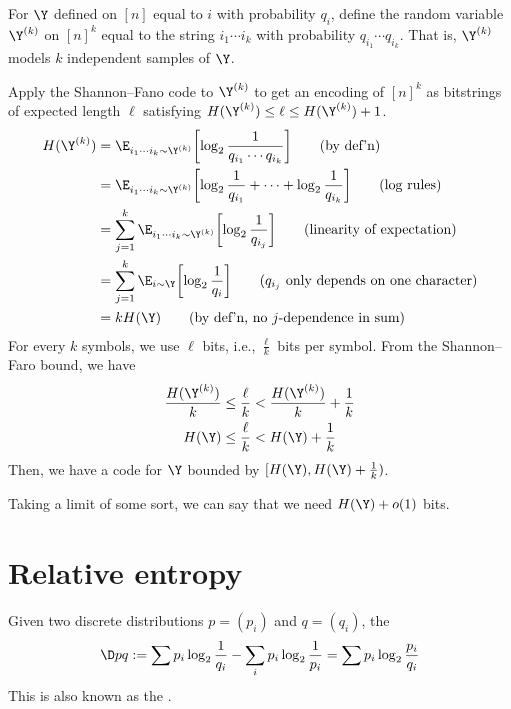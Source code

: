 \documentclass[class=co432,notes,tikz]{agony}
\begin{document}
\begin{sol}[batching]
  For $\Y$ defined on $[n]$ equal to $i$ with probability $q_i$,
  define the random variable $\Y^{(k)}$ on $[n]^k$
  equal to the string $i_1\cdots i_k$ with probability $q_{i_1}\cdots q_{i_k}$.
  That is, $\Y^{(k)}$ models $k$ independent samples of $\Y$.

  Apply the Shannon--Fano code to $\Y^{(k)}$
  to get an encoding of $[n]^k$ as bitstrings of expected length $\ell$
  satisfying $H(\Y^{(k)}) \leq \ell \leq H(\Y^{(k)}) + 1$.
  \begin{align*}
    H(\Y^{(k)}) & = \E_{i_1\cdots i_k \sim \Y^{(k)}}\qty[\log_2 \frac{1}{q_{i_1}\cdots q_{i_k}}] \tag{by def'n}                       \\
                & = \E_{i_1\cdots i_k \sim \Y^{(k)}}\qty[\log_2 \frac{1}{q_{i_1}} + \dotsb + \log_2\frac{1}{q_{i_k}}] \tag{log rules} \\
                & = \sum_{j=1}^k \E_{i_1\cdots i_k \sim \Y^{(k)}}\qty[\log_2 \frac{1}{q_{i_j}}] \tag{linearity of expectation}        \\
                & = \sum_{j=1}^k \E_{i \sim \Y}\qty[\log_2 \frac{1}{q_{i}}] \tag{$q_{i_j}$ only depends on one character}             \\
                & = kH(\Y) \tag{by def'n, no $j$-dependence in sum}
  \end{align*}
  For every $k$ symbols, we use $\ell$ bits, i.e., $\frac{\ell}{k}$ bits per symbol.
  From the Shannon--Faro bound, we have
  \begin{align*}
    \frac{H(\Y^{(k)})}{k} & \leq \frac{\ell}{k} < \frac{H(\Y^{(k)})}{k} + \frac{1}{k} \\
    H(\Y)                 & \leq \frac{\ell}{k} < H(\Y) + \frac{1}{k}
  \end{align*}
  Then, we have a code for $\Y$ bounded by
  $[H(\Y), H(\Y) + \frac{1}{k})$.

  Taking a limit of some sort, we can say that we need $H(\Y) + o(1)$ bits.
\end{sol}

\chapter{Relative entropy}
\begin{defn*}
  Given two discrete distributions $p = (p_i)$ and $q = (q_i)$,
  the 
  \[ \D p q :=
    \sum p_i \log_2\frac{1}{q_i} - \sum_i p_i \log_2 \frac{1}{p_i}
    = \sum p_i \log_2 \frac{p_i}{q_i} \]
  This is also known as the .
\end{defn*}
\end{document}
